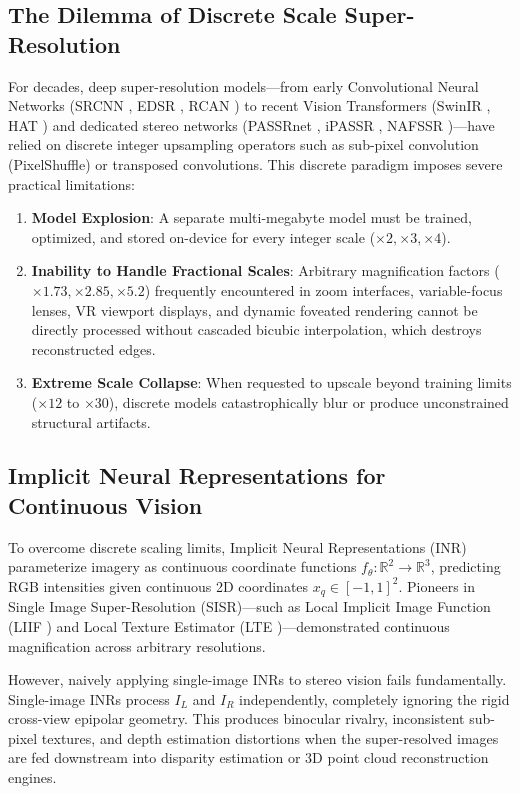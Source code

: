 \documentclass[10pt,journal,compsoc]{IEEEtran}
\begin{document}
\subsection{The Dilemma of Discrete Scale Super-Resolution}
For decades, deep super-resolution models---from early Convolutional Neural Networks (SRCNN \cite{dong2015image}, EDSR \cite{lim2017enhanced}, RCAN \cite{zhang2018image}) to recent Vision Transformers (SwinIR \cite{liang2021swinir}, HAT \cite{chen2023activating}) and dedicated stereo networks (PASSRnet \cite{wang2019learning}, iPASSR \cite{ying2020stereo}, NAFSSR \cite{chu2022nafssr})---have relied on discrete integer upsampling operators such as sub-pixel convolution (PixelShuffle) or transposed convolutions. This discrete paradigm imposes severe practical limitations:
\begin{enumerate}
    \item \textbf{Model Explosion}: A separate multi-megabyte model must be trained, optimized, and stored on-device for every integer scale ($\times 2, \times 3, \times 4$).
    \item \textbf{Inability to Handle Fractional Scales}: Arbitrary magnification factors ($\times 1.73, \times 2.85, \times 5.2$) frequently encountered in zoom interfaces, variable-focus lenses, VR viewport displays, and dynamic foveated rendering cannot be directly processed without cascaded bicubic interpolation, which destroys reconstructed edges.
    \item \textbf{Extreme Scale Collapse}: When requested to upscale beyond training limits ($\times 12$ to $\times 30$), discrete models catastrophically blur or produce unconstrained structural artifacts.
\end{enumerate}

\subsection{Implicit Neural Representations for Continuous Vision}
To overcome discrete scaling limits, Implicit Neural Representations (INR) parameterize imagery as continuous coordinate functions $f_\theta: \mathbb{R}^2 \to \mathbb{R}^3$, predicting RGB intensities given continuous 2D coordinates $x_q \in [-1, 1]^2$. Pioneers in Single Image Super-Resolution (SISR)---such as Local Implicit Image Function (LIIF \cite{chen2021learning}) and Local Texture Estimator (LTE \cite{lee2022local})---demonstrated continuous magnification across arbitrary resolutions. 

However, naively applying single-image INRs to stereo vision fails fundamentally. Single-image INRs process $I_L$ and $I_R$ independently, completely ignoring the rigid cross-view epipolar geometry. This produces binocular rivalry, inconsistent sub-pixel textures, and depth estimation distortions when the super-resolved images are fed downstream into disparity estimation or 3D point cloud reconstruction engines.
\end{document}
